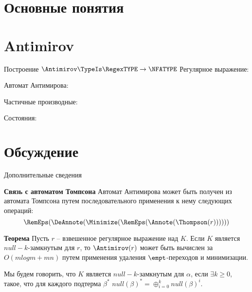 \section{Основные понятия}

\section{Antimirov}
\begin{frame}{Построение $\Antimirov\TypeIs\RegexTYPE\to\NFATYPE$}
	Регулярное выражение:

	Автомат Антимирова:


	Частичные производные:


	Состояния:


\end{frame}

\section{Обсуждение}
\begin{frame}{Дополнительные сведения}
    \begin{block}{\bf Связь с автоматом Томпсона}
        Автомат Антимирова может быть получен из автомата Томпсона путем последовательного применения к нему следующих операций:
        \[\RemEps(\DeAnnote(\Minimize(\RemEps(\Annote(\Thompson(r))))))\] %
    \end{block}
    \begin{block}{\bf Теорема}
        Пусть $r$ -- взвешенное регулярное выражение над $K$. Если $K$ является $null-k$-замкнутым для $r$, то $\Antimirov(r)$ может быть вычислен за $O(m log m + mn)$ путем применения удаления $\empt$-переходов и минимизации.
    \end{block}
    Мы будем говорить, что $K$ является $null-k$-замкнутым для $\alpha$, если $\exists k \geq 0$, такое, что для каждого подтерма $\beta^*$ $null(\beta)^* = \oplus_{i=0}^{k} null(\beta)^i$.
\end{frame}
